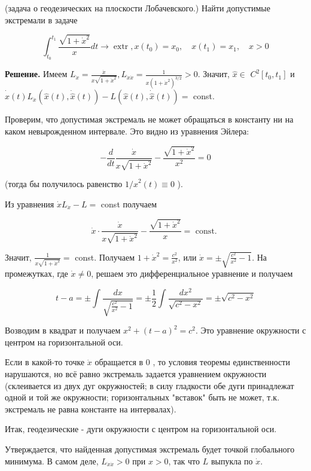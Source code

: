 \begin{task}
(задача о геодезических на плоскости Лобачевского.) Найти допустимые экстремали в задаче

$$
\int_{t_{0}}^{t_{1}} \frac{\sqrt{1+\dot{x}^{2}}}{x} d t \rightarrow \operatorname{extr}, x\left(t_{0}\right)=x_{0}, \quad x\left(t_{1}\right)=x_{1}, \quad x>0
$$

\textbf{Решение.} 
Имеем $L_{\dot{x}}=\frac{\dot{x}}{x \sqrt{1+\dot{x}^{2}}}, L_{\dot{x} \dot{x}}=\frac{1}{x\left(1+\dot{x}^{2}\right)^{3 / 2}}>0$. Значит, $\hat{x} \in$ $C^{2}\left[t_{0}, t_{1}\right]$ и $\dot{\hat{x}}(t) L_{\dot{x}}(\hat{x}(t), \dot{\hat{x}}(t))-L(\hat{x}(t), \dot{\hat{x}}(t))=$ const.

Проверим, что допустимая экстремаль не может обращаться в константу ни на каком невырожденном интервале. Это видно из уравнения Эйлера:

$$
-\frac{d}{d t} \frac{\dot{x}}{x \sqrt{1+\dot{x}^{2}}}-\frac{\sqrt{1+\dot{x}^{2}}}{x^{2}}=0
$$

(тогда бы получилось равенство $1 / \hat{x}^{2}(t) \equiv 0$ ).

Из уравнения $\dot{x} L_{\dot{x}}-L=$ const получаем

$$
\dot{x} \cdot \frac{\dot{x}}{x \sqrt{1+\dot{x}^{2}}}-\frac{\sqrt{1+\dot{x}^{2}}}{x}=\text { const. }
$$

Значит, $\frac{1}{x \sqrt{1+\dot{x}^{2}}}=$ const. Получаем $1+\dot{x}^{2}=\frac{c^{2}}{x^{2}}$, 
или $\dot{x}= \pm \sqrt{\frac{c^{2}}{x^{2}} - 1}$. На промежутках, где $\dot{x} \neq 0$, решаем это дифференциальное уравнение и получаем

$$
t-a= \pm \int \frac{d x}{\sqrt{\frac{c^{2}}{x^{2}} - 1}}= \pm \frac{1}{2} \int \frac{d x^{2}}{\sqrt{c^{2}-x^{2}}}= \pm \sqrt{c^{2}-x^{2}}
$$

Возводим в квадрат и получаем $x^{2}+(t-a)^{2}=c^{2}$. Это уравнение окружности с центром на горизонтальной оси.

Если в какой-то точке $\dot{x}$ обращается в 0 , то условия теоремы единственности нарушаются, но всё равно экстремаль задается уравнением окружности (склеивается из двух дуг окружностей; в силу гладкости обе дуги принадлежат одной и той же окружности; горизонтальных "вставок" быть не может, т.к. экстремаль не равна константе на интервалах).

Итак, геодезические - дуги окружности с центром на горизонтальной оси.

Утверждается, что найденная допустимая экстремаль будет точкой глобального минимума. В самом деле, $L_{\dot{x} \dot{x}}>0$ при $x>0$, так что $L$ выпукла по $\dot{x}$.

\end{task}